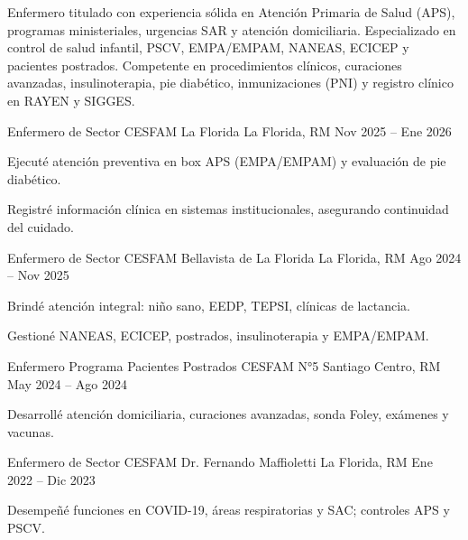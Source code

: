 \documentclass[11pt,a4paper]{awesome-cv}
\begin{document}
\makecvheader[C]

\begin{cvparagraph}
Enfermero titulado con experiencia sólida en Atención Primaria de Salud (APS), programas ministeriales, urgencias SAR y atención domiciliaria. Especializado en control de salud infantil, PSCV, EMPA/EMPAM, NANEAS, ECICEP y pacientes postrados. Competente en procedimientos clínicos, curaciones avanzadas, insulinoterapia, pie diabético, inmunizaciones (PNI) y registro clínico en RAYEN y SIGGES.
\end{cvparagraph}

\begin{cventries}
  \cventry
    {Enfermero de Sector}
    {CESFAM La Florida}
    {La Florida, RM}
    {Nov 2025 -- Ene 2026}
    {
      \begin{cvitems}
        \item {Ejecuté atención preventiva en box APS (EMPA/EMPAM) y evaluación de pie diabético.}
        \item {Registré información clínica en sistemas institucionales, asegurando continuidad del cuidado.}
      \end{cvitems}
    }
  \cventry
    {Enfermero de Sector}
    {CESFAM Bellavista de La Florida}
    {La Florida, RM}
    {Ago 2024 -- Nov 2025}
    {
      \begin{cvitems}
        \item {Brindé atención integral: niño sano, EEDP, TEPSI, clínicas de lactancia.}
        \item {Gestioné NANEAS, ECICEP, postrados, insulinoterapia y EMPA/EMPAM.}
      \end{cvitems}
    }
  \cventry
    {Enfermero Programa Pacientes Postrados}
    {CESFAM N°5}
    {Santiago Centro, RM}
    {May 2024 -- Ago 2024}
    {
      \begin{cvitems}
        \item {Desarrollé atención domiciliaria, curaciones avanzadas, sonda Foley, exámenes y vacunas.}
      \end{cvitems}
    }
  \cventry
    {Enfermero de Sector}
    {CESFAM Dr. Fernando Maffioletti}
    {La Florida, RM}
    {Ene 2022 -- Dic 2023}
    {
      \begin{cvitems}
        \item {Desempeñé funciones en COVID-19, áreas respiratorias y SAC; controles APS y PSCV.}
      \end{cvitems}
}
\end{cventries}
\end{document}
